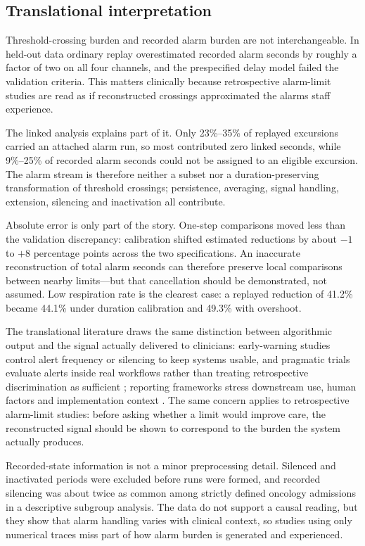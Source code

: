 \documentclass[11pt,letterpaper]{article}
\begin{document}
\subsection{Translational interpretation}

Threshold-crossing burden and recorded alarm burden are not interchangeable. In held-out data ordinary replay overestimated recorded alarm seconds by roughly a factor of two on all four channels, and the prespecified delay model failed the validation criteria. This matters clinically because retrospective alarm-limit studies are read as if reconstructed crossings approximated the alarms staff experience.

The linked analysis explains part of it. Only 23\%--35\% of replayed excursions carried an attached alarm run, so most contributed zero linked seconds, while 9\%--25\% of recorded alarm seconds could not be assigned to an eligible excursion. The alarm stream is therefore neither a subset nor a duration-preserving transformation of threshold crossings; persistence, averaging, signal handling, extension, silencing and inactivation all contribute.

Absolute error is only part of the story. One-step comparisons moved less than the validation discrepancy: calibration shifted estimated reductions by about $-1$ to $+8$ percentage points across the two specifications. An inaccurate reconstruction of total alarm seconds can therefore preserve local comparisons between nearby limits---but that cancellation should be demonstrated, not assumed. Low respiration rate is the clearest case: a replayed reduction of 41.2\% became 44.1\% under duration calibration and 49.3\% with overshoot.

The translational literature draws the same distinction between algorithmic output and the signal actually delivered to clinicians: early-warning studies control alert frequency or silencing to keep systems usable, and pragmatic trials evaluate alerts inside real workflows rather than treating retrospective discrimination as sufficient \citep{henry2015trewscore,hyland2020circulatory,lin2024ecg,rossetti2025concern}; reporting frameworks stress downstream use, human factors and implementation context \citep{rivera2020spiritai,vasey2022decideai}. The same concern applies to retrospective alarm-limit studies: before asking whether a limit would improve care, the reconstructed signal should be shown to correspond to the burden the system actually produces.

Recorded-state information is not a minor preprocessing detail. Silenced and inactivated periods were excluded before runs were formed, and recorded silencing was about twice as common among strictly defined oncology admissions in a descriptive subgroup analysis. The data do not support a causal reading, but they show that alarm handling varies with clinical context, so studies using only numerical traces miss part of how alarm burden is generated and experienced.
\end{document}
